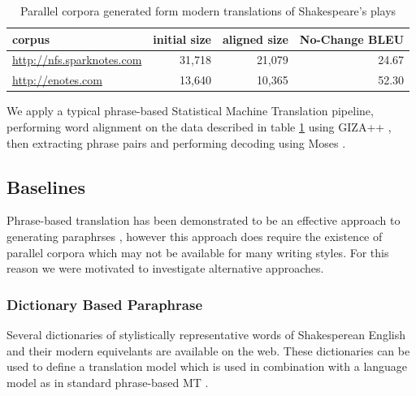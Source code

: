 \documentclass[10pt,a5paper,twoside]{article}
\begin{document}
\begin{table}
  \begin{center}
    \begin{tabular}{|l|r|r|r|}
      \hline
      corpus & initial size & aligned size & No-Change BLEU\\
      \hline
      \hline
      \url{http://nfs.sparknotes.com} & 31,718 & 21,079 & 24.67 \\
      \hline
      \url{http://enotes.com} & 13,640 & 10,365 & 52.30 \\
      \hline
    \end{tabular}
  \end{center}
  \caption{Parallel corpora generated form modern translations of Shakespeare's plays}
  \label{corpus_stats}
\end{table}

We apply a typical phrase-based Statistical Machine Translation pipeline, performing
word alignment on the data described in table \ref{corpus_stats} using GIZA++ \cite{Och03}, then extracting phrase pairs and performing decoding using Moses \cite{Koehn07}.

\subsection{Baselines}
Phrase-based translation has been demonstrated to be an effective approach to generating paraphrses \cite{chen11,quirk04}, however this approach does require the existence of
parallel corpora which may not be available for many writing styles.  For this reason we were motivated to investigate alternative approaches.

\subsubsection{Dictionary Based Paraphrase}
\label{dictionary_baseline}
Several dictionaries of stylistically representative words of Shakesperean English and their modern equivelants are available on the web.  These dictionaries can be used 
to define a translation model which is used in combination with a language model as in standard phrase-based MT \cite{Koehn00}.

\end{document}
